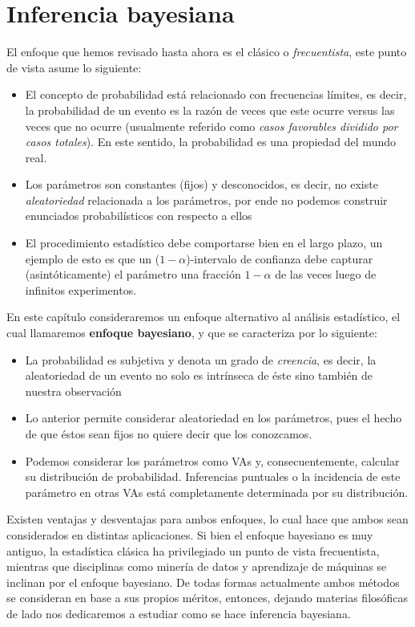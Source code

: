 

\chapter{Inferencia bayesiana}


El enfoque que hemos revisado hasta ahora  es el clásico o \emph{frecuentista}, este punto de vista asume lo siguiente: 
\begin{itemize}
	\item El concepto de probabilidad está relacionado con frecuencias límites, es decir, la probabilidad de un evento es la razón de veces que este ocurre versus las veces que no ocurre (usualmente referido como \emph{casos favorables dividido por casos totales}). En este sentido, la probabilidad es una propiedad del mundo real. 
	\item Los parámetros son constantes (fijos) y desconocidos, es decir, no existe \emph{aleatoriedad} relacionada a los parámetros, por ende no podemos construir enunciados probabilísticos con respecto a ellos
	\item El procedimiento estadístico debe comportarse bien en el largo plazo, un ejemplo de esto es que un ($1-\alpha$)-intervalo de confianza debe capturar (asintóticamente) el parámetro una fracción $1-\alpha$ de las veces luego de infinitos experimentos. 
\end{itemize}

En este capítulo consideraremos un enfoque alternativo al análisis estadístico, el cual llamaremos \textbf{enfoque bayesiano}, y que se caracteriza por lo siguiente: 

\begin{itemize}
 	\item La probabilidad es subjetiva y denota un grado de \emph{creencia}, es decir, la aleatoriedad de un evento no solo es intrínseca de éste sino también de nuestra observación
 	\item Lo anterior permite considerar aleatoriedad en los parámetros, pues el hecho de que éstos sean fijos no quiere decir que los conozcamos. 
 	\item Podemos considerar los parámetros como VAs y, consecuentemente, calcular su distribución de probabilidad. Inferencias puntuales o la incidencia de este parámetro en otras VAs está completamente determinada por su distribución.
 \end{itemize}

 Existen ventajas y desventajas para ambos enfoques, lo cual hace que ambos sean considerados en distintas aplicaciones. Si bien el enfoque bayesiano es muy antiguo, la estadística clásica ha privilegiado un punto de vista frecuentista, mientras que disciplinas como minería de datos y aprendizaje de máquinas se inclinan por el enfoque bayesiano. De todas formas actualmente ambos métodos se consideran en base a sus propios méritos, entonces, dejando materias filosóficas de lado nos dedicaremos a estudiar como se hace inferencia bayesiana. 



